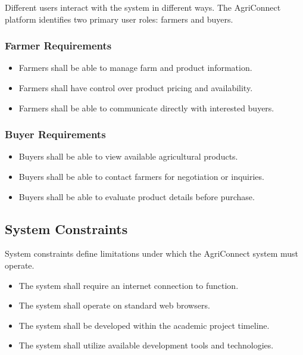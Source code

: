 \documentclass[12pt,a4paper]{article}
\begin{document}
Different users interact with the system in different ways. The AgriConnect platform identifies two primary user roles: farmers and buyers.

\subsubsection{Farmer Requirements}
\begin{itemize}
    \item Farmers shall be able to manage farm and product information.
    \item Farmers shall have control over product pricing and availability.
    \item Farmers shall be able to communicate directly with interested buyers.
\end{itemize}

\subsubsection{Buyer Requirements}
\begin{itemize}
    \item Buyers shall be able to view available agricultural products.
    \item Buyers shall be able to contact farmers for negotiation or inquiries.
    \item Buyers shall be able to evaluate product details before purchase.
\end{itemize}

\subsection{System Constraints}

System constraints define limitations under which the AgriConnect system must operate.

\begin{itemize}
    \item The system shall require an internet connection to function.
    \item The system shall operate on standard web browsers.
    \item The system shall be developed within the academic project timeline.
    \item The system shall utilize available development tools and technologies.
\end{itemize}

\end{document}
